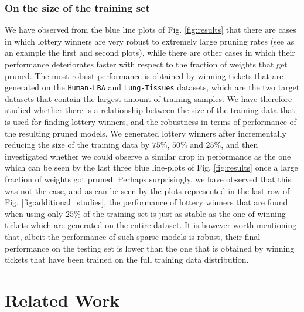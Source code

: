 \subsubsection{On the size of the training set}
We have observed from the blue line plots of Fig. \ref{fig:results} that there are cases in which lottery winners are very robust to extremely large pruning rates (see as an example the first and second plots), while there are other cases in which their performance deteriorates faster with respect to the fraction of weights that get pruned. The most robust performance is obtained by winning tickets that are generated on the \texttt{Human-LBA} and \texttt{Lung-Tissues} datasets, which are the two target datasets that contain the largest amount of training samples. We have therefore studied whether there is a relationship between the size of the training data that is used for finding lottery winners, and the robustness in terms of performance of the resulting pruned models. We generated lottery winners after incrementally reducing the size of the training data by $75\%$, $50\%$ and $25\%$, and then investigated whether we could observe a similar drop in performance as the one which can be seen by the last three blue line-plots of Fig. \ref{fig:results} once a large fraction of weights got pruned. Perhaps surprisingly, we have observed that this was not the case, and as can be seen by the plots represented in the last row of Fig. \ref{fig:additional_studies}, the performance of lottery winners that are found when using only $25\%$ of the training set is just as stable as the one of winning tickets which are generated on the entire dataset. It is however worth mentioning that, albeit the performance of such sparse models is robust, their final performance on the testing set is lower than the one that is obtained by winning tickets that have been trained on the full training data distribution.




\section{Related Work}
\label{sec:related_work}

